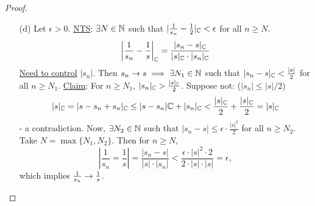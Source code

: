 \documentclass[]{article}
\begin{document}
\begin{proof}
\begin{enumerate}
		\item[(d)] Let $\epsilon>0$. \ul{NTS}: $\exists N\in\mathbb{N}$ such that $|\frac{1}{s_n} - \frac{1}{2}|_{\mathbb{C}} <\epsilon$ for all $n\geq N$. 
			$$ \left| \frac{1}{s_n} - \frac{1}{s} \right|_{\mathbb{C}} = \frac{|s_n-s|_{\mathbb{C}}}{|s|_{\mathbb{C}}\cdot |s_n|_{\mathbb{C}}} $$ 
			\ul{Need to control} $|s_n|$.
			Then $s_n\rightarrow s\implies \exists N_1\in\mathbb{N}$ such that $|s_n-s|_{\mathbb{C}} < \frac{|s|}{2}$ for all $n\geq N_1$.
			\ul{Claim}: For $n\geq N_1$, $|s_n|_{\mathbb{C}} > \frac{|s|_{\mathbb{C}}}{2}$.
			Suppose not: ($|s_n|\leq |s|/2$)
			$$ |s|_{\mathbb{C}} = |s-s_n + s_n|_{\mathbb{C}} \leq |s-s_n|\mathbb{C} + |s_n|_{\mathbb{C}} < \frac{|s|_{\mathbb{C}}}{2} + \frac{|s|_{\mathbb{C}}}{2} = |s|_{\mathbb{C}}$$ - a contradiction.
			Now, $\exists N_2\in\mathbb{N}$ such that $|s_n - s|\leq \epsilon\cdot \frac{|s|^2}{2}$ for all $n\geq N_2$.
			Take $N = \max\{N_1,N_2\}$. Then for $n\geq N$,
			$$ \left| \frac{1}{s_n} = \frac{1}{s} \right| = \frac{|s_n-s|}{|s|\cdot |s_n|} < \frac{\epsilon\cdot |s|^2\cdot 2}{2\cdot|s|\cdot |s|} = \epsilon,$$
			which implies $\frac{1}{s_n} \rightarrow \frac{1}{s}$.
	\end{enumerate}
\end{proof}
\end{document}
